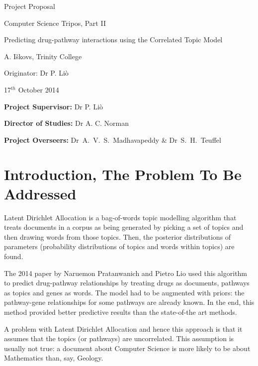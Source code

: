 \documentclass[12pt,a4]{article}
\begin{document}
\vfil

\centerline{\Large Project Proposal}
\vspace{0.4in}
\centerline{\Large Computer Science Tripos, Part II}
\vspace{0.4in}
\centerline{\Large Predicting drug-pathway interactions using the Correlated Topic Model }
\vspace{0.4in}
\centerline{\large A. I\v{s}kovs, Trinity College}
\vspace{0.3in}
\centerline{\large Originator: Dr P. Li\`{o}}
\vspace{0.3in}
\centerline{\large 17$^{th}$ October 2014}

\vfil


\noindent
{\bf Project Supervisor:} Dr P. Li\`{o}
\vspace{0.2in}

\noindent
{\bf Director of Studies:} Dr A. C. Norman
\vspace{0.2in}
\noindent
 
\noindent
{\bf Project Overseers:} Dr~A.~V.~S.~Madhavapeddy  \& Dr~S.~H.~Teuffel

\pagebreak


\section*{Introduction, The Problem To Be Addressed}

Latent Dirichlet Allocation\cite{Blei} is a bag-of-words topic modelling algorithm that treats documents in a corpus as being generated by picking a set of topics and then drawing words from those topics. Then, the posterior distributions of parameters (probability distributions of topics and words within topics) are found.

The 2014 paper\cite{Pratanwanich2014} by Naruemon Pratanwanich and Pietro Lio used this algorithm to predict drug-pathway relationships by treating drugs as documents, pathways as topics and genes as words. The model had to be augmented with priors: the pathway-gene relationships for some pathways are already known. In the end, this method provided better predictive results than the state-of-the art methods.

A problem with Latent Dirichlet Allocation and hence this approach is that it assumes that the topics (or pathways) are uncorrelated. This assumption is usually not true: a document about Computer Science is more likely to be about Mathematics than, say, Geology. 
\end{document}

